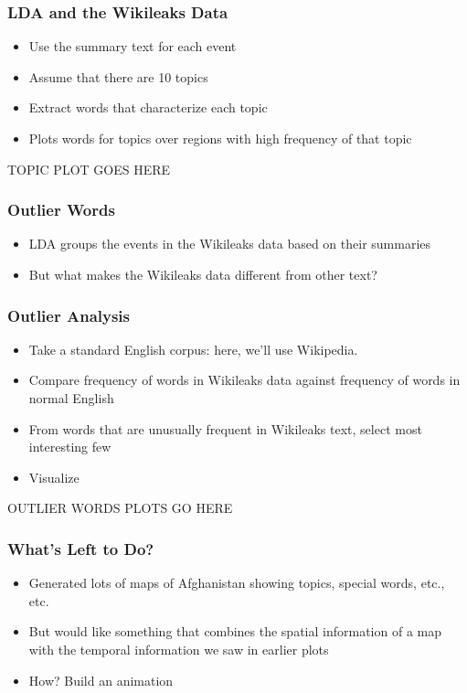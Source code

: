 \documentclass[xcolor=dvipsnames, 9pt]{beamer}
\begin{document}
\begin{frame}[fragile]
  \frametitle{LDA and the Wikileaks Data}
  
  \begin{itemize}
    \item{Use the summary text for each event}
    \item{Assume that there are 10 topics}
    \item{Extract words that characterize each topic}
    \item{Plots words for topics over regions with high frequency of that topic}
  \end{itemize}
\end{frame}

\begin{frame}[fragile]
  TOPIC PLOT GOES HERE
\end{frame}

\begin{frame}
  \frametitle{Outlier Words}
  
  \begin{itemize}
    \item{LDA groups the events in the Wikileaks data based on their summaries}
    \item{But what makes the Wikileaks data different from other text?}
  \end{itemize}
\end{frame}

\begin{frame}[fragile]
  \frametitle{Outlier Analysis}
  
  \begin{itemize}
    \item{Take a standard English corpus: here, we'll use Wikipedia.}
    \item{Compare frequency of words in Wikileaks data against frequency of words in normal English}
    \item{From words that are unusually frequent in Wikileaks text, select most interesting few}
    \item{Visualize}
  \end{itemize}
\end{frame}

\begin{frame}
  OUTLIER WORDS PLOTS GO HERE
\end{frame}

\begin{frame}[fragile]
  \frametitle{What's Left to Do?}
  
  \begin{itemize}
    \item{Generated lots of maps of Afghanistan showing topics, special words, etc., etc.}
    \item{But would like something that combines the spatial information of a map with the temporal information we saw in earlier plots}
    \item{How? Build an animation}
  \end{itemize}
\end{frame}
\end{document}
